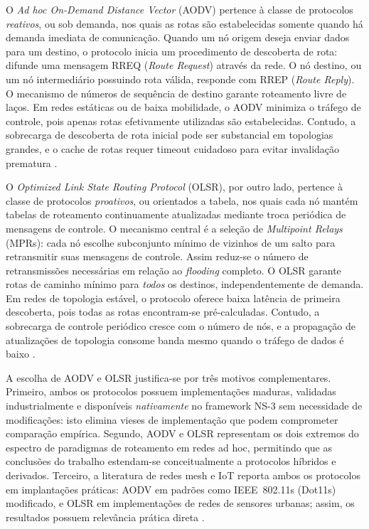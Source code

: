 \documentclass[12pt]{article}
\begin{document}
O \textit{Ad hoc On-Demand Distance Vector} (AODV) pertence à classe de protocolos \textit{reativos}, ou sob demanda, nos quais as rotas são estabelecidas somente quando há demanda imediata de comunicação. Quando um nó origem deseja enviar dados para um destino, o protocolo inicia um procedimento de descoberta de rota: difunde uma mensagem RREQ (\textit{Route Request}) através da rede. O nó destino, ou um nó intermediário possuindo rota válida, responde com RREP (\textit{Route Reply}). O mecanismo de números de sequência de destino garante roteamento livre de laços. Em redes estáticas ou de baixa mobilidade, o AODV minimiza o tráfego de controle, pois apenas rotas efetivamente utilizadas são estabelecidas. Contudo, a sobrecarga de descoberta de rota inicial pode ser substancial em topologias grandes, e o cache de rotas requer timeout cuidadoso para evitar invalidação prematura \cite{perkins2003ad}.

O \textit{Optimized Link State Routing Protocol} (OLSR), por outro lado, pertence à classe de protocolos \textit{proativos}, ou orientados a tabela, nos quais cada nó mantém tabelas de roteamento continuamente atualizadas mediante troca periódica de mensagens de controle. O mecanismo central é a seleção de \textit{Multipoint Relays} (MPRs): cada nó escolhe subconjunto mínimo de vizinhos de um salto para retransmitir suas mensagens de controle. Assim reduz-se o número de retransmissões necessárias em relação ao \textit{flooding} completo. O OLSR garante rotas de caminho mínimo para \textit{todos} os destinos, independentemente de demanda. Em redes de topologia estável, o protocolo oferece baixa latência de primeira descoberta, pois todas as rotas encontram-se pré-calculadas. Contudo, a sobrecarga de controle periódico cresce com o número de nós, e a propagação de atualizações de topologia consome banda mesmo quando o tráfego de dados é baixo \cite{clausen2003optimized}.

A escolha de AODV e OLSR justifica-se por três motivos complementares. Primeiro, ambos os protocolos possuem implementações maduras, validadas industrialmente e disponíveis \textit{nativamente} no framework NS-3 sem necessidade de modificações: isto elimina vieses de implementação que podem comprometer comparação empírica. Segundo, AODV e OLSR representam os dois extremos do espectro de paradigmas de roteamento em redes ad hoc, permitindo que as conclusões do trabalho estendam-se conceitualmente a protocolos híbridos e derivados. Terceiro, a literatura de redes mesh e IoT reporta ambos os protocolos em implantações práticas: AODV em padrões como IEEE~802.11s (Dot11s) modificado, e OLSR em implementações de redes de sensores urbanas; assim, os resultados possuem relevância prática direta \cite{research_lee_2024}.
\end{document}
